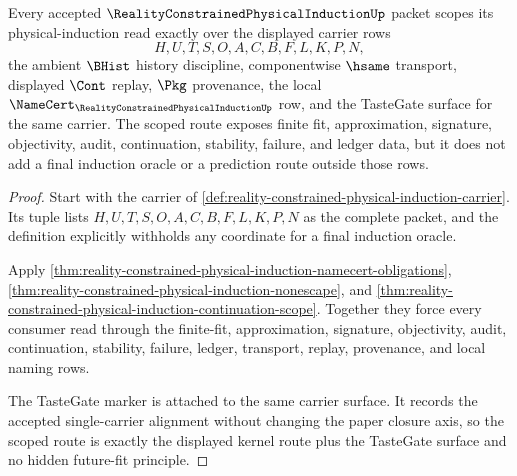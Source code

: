 \begin{theorem}
\label{thm:reality-constrained-physical-induction-scoped-kernel-route}
Every accepted $\RealityConstrainedPhysicalInductionUp$ packet scopes its physical-induction read exactly over the displayed carrier rows
$$
H,U,T,S,O,A,C,B,F,L,K,P,N,
$$
the ambient $\BHist$ history discipline, componentwise $\hsame$ transport, displayed $\Cont$ replay, $\Pkg$ provenance, the local $\NameCert_{\RealityConstrainedPhysicalInductionUp}$ row, and the TasteGate surface for the same carrier. The scoped route exposes finite fit, approximation, signature, objectivity, audit, continuation, stability, failure, and ledger data, but it does not add a final induction oracle or a prediction route outside those rows.
\end{theorem}
\begin{proof}
Start with the carrier of \autoref{def:reality-constrained-physical-induction-carrier}. Its tuple lists $H,U,T,S,O,A,C,B,F,L,K,P,N$ as the complete packet, and the definition explicitly withholds any coordinate for a final induction oracle.

Apply \autoref{thm:reality-constrained-physical-induction-namecert-obligations}, \autoref{thm:reality-constrained-physical-induction-nonescape}, and \autoref{thm:reality-constrained-physical-induction-continuation-scope}. Together they force every consumer read through the finite-fit, approximation, signature, objectivity, audit, continuation, stability, failure, ledger, transport, replay, provenance, and local naming rows.

The TasteGate marker is attached to the same carrier surface. It records the accepted single-carrier alignment without changing the paper closure axis, so the scoped route is exactly the displayed kernel route plus the TasteGate surface and no hidden future-fit principle.
\end{proof}

